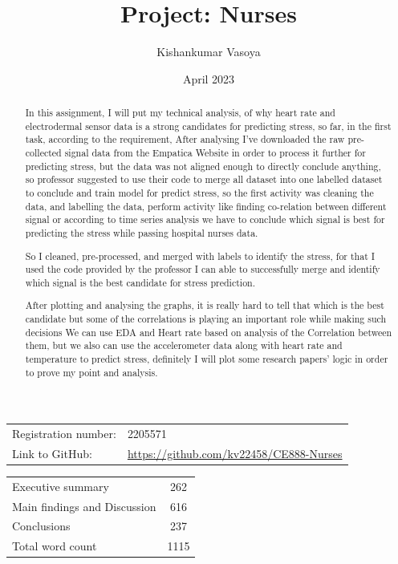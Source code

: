 \documentclass{article}
\author{Kishankumar Vasoya}
\date{April 2023}
\title{Project: Nurses}
\begin{document}
\maketitle

\begin{table}[h]
    \centering
    \begin{tabular}{ll}
        Registration number: &2205571\\
        Link to GitHub: & \url{https://github.com/kv22458/CE888-Nurses}\\
    \end{tabular}
\end{table}



\begin{table}[h]
    \centering
    \begin{tabular}{lc}
        Executive summary & {262}\\
        Main findings and Discussion & {616}\\
        Conclusions & {237}\\
        \hline
        Total word count & {1115}\\
    \end{tabular}
\end{table}

\tableofcontents

\clearpage


\begin{abstract}
In this assignment, I will put my technical analysis, of why heart rate and electrodermal sensor data is a strong candidates for predicting stress, so far, in the first task, according to the requirement, After analysing I've downloaded the raw pre-collected signal data from the Empatica Website in order to process it further for predicting stress, but the data was not aligned enough to directly conclude anything, so professor suggested to use their code to merge all dataset into one labelled dataset to conclude and train model for predict stress, so the first activity was cleaning the data, and labelling the data, perform activity like finding co-relation between different signal or according to time series analysis we have to conclude which signal is best for predicting the stress while passing hospital nurses data.\cite{Hosseini2022}

So I cleaned, pre-processed, and merged with labels to identify the stress, for that I used the code provided by the professor I can able to successfully merge and identify which signal is the best candidate for stress prediction.

After plotting and analysing the graphs, it is really hard to tell that which is the best candidate but some of the correlations is playing an important role while making such decisions
We can use EDA and Heart rate based on analysis of the Correlation between them, but we also can use the accelerometer data along with heart rate and temperature to predict stress, definitely I will plot some research papers' logic in order to prove my point and analysis.
\end{abstract}
\end{document}
